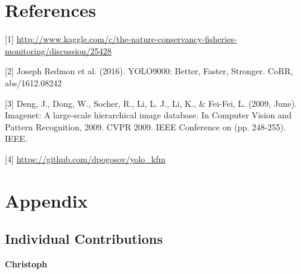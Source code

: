 \documentclass[a4paper]{article}
\begin{document}
\section{References}

{\parindent0pt

[1] \url{http://www.kaggle.com/c/the-nature-conservancy-fisheries-monitoring/discussion/25428}

[2] Joseph Redmon et al. (2016). YOLO9000: Better, Faster, Stronger. CoRR, abs/1612.08242

[3] Deng, J., Dong, W., Socher, R., Li, L. J., Li, K., \& Fei-Fei, L. (2009, June). Imagenet: A large-scale hierarchical image database. In Computer Vision and Pattern Recognition, 2009. CVPR 2009. IEEE Conference on (pp. 248-255). IEEE.

[4] \url{https://github.com/dpogosov/yolo_kfm}

}
\section*{Appendix}


\subsection*{Individual Contributions}


\textbf{Christoph}\\
\end{document}
